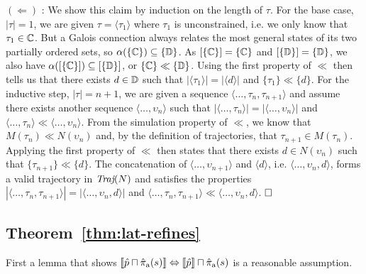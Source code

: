

$(\Leftarrow)$ : We show this claim by induction on the length of $\tau$. For the base case, $| \tau | = 1$, we are given $\tau = \langle \tau_{1} \rangle$ where $\tau_{1}$ is unconstrained, i.e. we only know that $\tau_{1} \in \mathbb{C}$. But a Galois connection always relates the most general states of its two partially ordered sets, so $\alpha(\{ \mathbb{C} \}) \subseteq \{ \mathbb{D} \}$. As $[\{ \mathbb{C} \}] = \{ \mathbb{C} \}$ and $[\{ \mathbb{D} \}] = \{ \mathbb{D} \}$, we also have $\alpha([\{ \mathbb{C} \}]) \subseteq [\{ \mathbb{D} \}]$, or $\{ \mathbb{C} \} \ll \{ \mathbb{D} \}$. Using the first property of $\ll$ then tells us that there exists $d \in \mathbb{D}$ such that $|\langle \tau_{1} \rangle| = |\langle d \rangle|$ and $\{ \tau_{1} \} \ll \{ d \}$. For the inductive step, $| \tau | = n + 1$, we are given a sequence $\langle \dots, \tau_{n}, \tau_{n+1} \rangle$ and assume there exists another sequence $\langle \dots, \upsilon_{n} \rangle$ such that $|\langle \dots, \tau_{n} \rangle| = |\langle \dots, \upsilon_{n} \rangle|$ and $\langle \dots, \tau_{n} \rangle \ll \langle \dots, \upsilon_{n} \rangle$. From the simulation property of $\ll$, we know that $M(\tau_{n}) \ll N(\upsilon_{n})$ and, by the definition of trajectories, that $\tau_{n+1} \in M(\tau_{n})$. Applying the first property of $\ll$ then states that there exists $d \in N(\upsilon_{n})$ such that $\{ \tau_{n+1} \} \ll \{ d \}$. The concatenation of $\langle \dots, \upsilon_{n+1} \rangle$ and $\langle d \rangle$, i.e. $\langle \dots, \upsilon_{n}, d \rangle$, forms a valid trajectory in $\operatorname{\textit{Traj}}(N)$ and satisfies the properties $| \langle \dots, \tau_{n}, \tau_{n+1} \rangle | = | \langle \dots, \upsilon_{n}, d \rangle |$ and $\langle \dots, \tau_{n}, \tau_{n+1} \rangle \ll \langle \dots, \upsilon_{n}, d \rangle$. $\qedbox$


\subsection{Theorem~\ref{thm:lat-refines}}

First a lemma that shows $\llbracket \hat p \sqcap \operatorname{\hat{\pi}_{\textrm{a}}}(s) \rrbracket \Leftrightarrow \llbracket \hat p \rrbracket \sqcap \operatorname{\hat{\pi}_{\textrm{a}}}(s)$ is a reasonable assumption.

